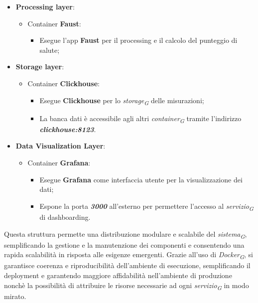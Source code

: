 \begin{itemize}
\begin{itemize}
    \end{itemize} 
    \item \textbf{Processing layer}:
    \begin{itemize}
        \item Container \textbf{Faust}:
        \begin{itemize}
            \item Esegue l'app \textbf{Faust} per il processing e il calcolo del punteggio di salute;
        \end{itemize}
    \end{itemize}
    \item \textbf{Storage layer}:
    \begin{itemize}
        \item Container \textbf{Clickhouse}:
        \begin{itemize}
            \item Esegue \textbf{Clickhouse} per lo \textit{storage}\textsubscript{\textit{G}} delle misurazioni;
            \item La banca dati è accessibile agli altri \textit{container}\textsubscript{\textit{G}} tramite l'indirizzo \textit{\textbf{clickhouse:8123}}.
        \end{itemize}
    \end{itemize}
    \item \textbf{Data Visualization Layer}:
    \begin{itemize}
        \item Container \textbf{Grafana}:
        \begin{itemize}
            \item Esegue \textbf{Grafana} come interfaccia utente per la visualizzazione dei dati;
            \item Espone la porta \textbf{\textit{3000}} all'esterno per permettere l'accesso al \textit{servizio}\textsubscript{\textit{G}} di dashboarding.
        \end{itemize}
    \end{itemize}
    
\end{itemize}
Questa struttura permette una distribuzione modulare e scalabile del \textit{sistema}\textsubscript{\textit{G}}, semplificando la gestione e la manutenzione dei componenti e consentendo una rapida scalabilità in risposta alle esigenze emergenti. Grazie all'uso di \textit{Docker}\textsubscript{\textit{G}}, si garantisce coerenza e riproducibilità dell'ambiente di esecuzione, semplificando il deployment e garantendo maggiore affidabilità nell'ambiente di produzione nonchè la possibilità di attribuire le risorse necessarie ad ogni \textit{servizio}\textsubscript{\textit{G}} in modo mirato.

